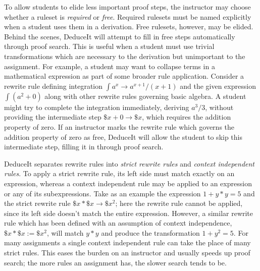 \documentclass{sigchi}
\newcommand{\msb}[1]{\textbf{\textcolor{cyan}{Michael: #1}}}
\begin{document}
To allow students to elide less important proof steps, the instructor may choose whether a ruleset is \emph{required} or \emph{free}. Required rulesets must be named explicitly when a student uses them in a derivation. Free rulesets, however, may be elided. Behind the scenes, DeduceIt will attempt to fill in free steps automatically through proof search. This is useful when a student must use trivial transformations which are necessary to the derivation but unimportant to the assignment. For example, a student may want to collapse terms in a mathematical expression as part of some broader rule application. Consider a rewrite rule defining integration $\int{a^x} \rightarrow a^{x+1}/(x+1)$ and the given expression $\int{(a^2+0)}$ along with other rewrite rules governing basic algebra. A student might try to complete the integration immediately, deriving $a^3/3$, without providing the intermediate step $\$x+0 \rightarrow \$x$, which requires the addition property of zero. If an instructor marks the rewrite rule which governs the addition property of zero as free, DeduceIt will allow the student to skip this intermediate step, filling it in through proof search. %

DeduceIt separates rewrite rules into \emph{strict rewrite rules} and \emph{context independent rules}. To apply a strict rewrite rule, its left side must match exactly on an expression, whereas a context independent rule may be applied to an expression or any of its subexpressions. Take as an example the expression $1+y*y=5$ and the strict rewrite rule $\$x*\$x \rightarrow \$x^2$; here the rewrite rule cannot be applied, since its left side doesn't match the entire expression. However, a similar rewrite rule which has been defined with an assumption of context independence, $\$x*\$x := \$x^2$, will match $y*y$ and produce the transformation $1+y^2=5$. For many assignments a single context independent rule can take the place of many strict rules. This eases the burden on an instructor and usually speeds up proof search; the more rules an assignment has, the slower search tends to be.
\end{document}
